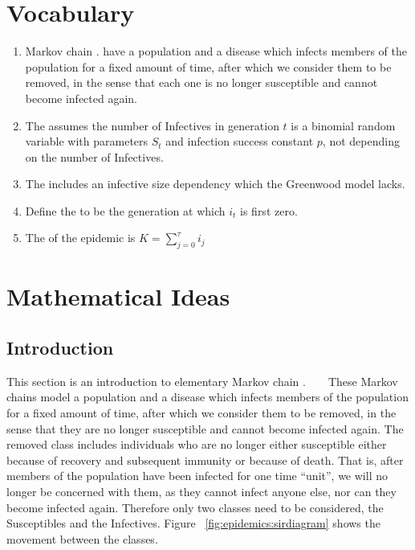 \documentclass[12pt]{article}
\begin{document}
\section*{Vocabulary}
\begin{enumerate}
    \item
        Markov chain .
        have a population and a disease which infects members of the
        population for a fixed amount of time, after which we consider
        them to be removed, in the sense that each one is no longer
        susceptible and cannot become infected again.
    \item
        The  assumes the number of Infectives in
        generation \( t \) is a binomial random variable with parameters
        \( S_t \) and infection success constant \( p \), not depending
        on the number of Infectives.
    \item
        The  includes an infective size
        dependency which the Greenwood model lacks.
    \item
        Define the  to
        be the generation at which \( i_t \) is first zero.
    \item
        The  of the epidemic is \( K=\sum_{j = 0}^{\tau}
        i_j \)
\end{enumerate}

\hr

\section*{Mathematical Ideas}

\subsection*{Introduction}

This section is an introduction to elementary Markov chain .  ~%
~%
These Markov chains model a population and a disease which infects
members of the population for a fixed amount of time, after which we
consider them to be removed, in the sense that they are no longer
susceptible and cannot become infected again.  The removed class
includes individuals who are no longer either susceptible either because
of recovery and subsequent immunity or because of death. That is, after
members of the population have been infected for one time ``unit'', we
will no longer be concerned with them, as they cannot infect anyone
else, nor can they become infected again.  Therefore only two classes
need to be considered, the Susceptibles and the Infectives. Figure~%
\ref{fig:epidemics:sirdiagram} shows the movement between the classes.
\end{document}
